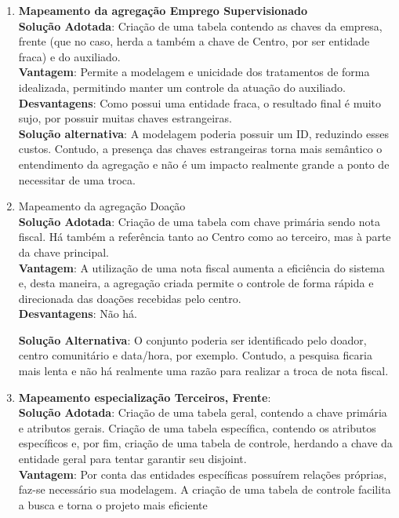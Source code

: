 \begin{enumerate}
    \item \textbf{Mapeamento da agregação Emprego Supervisionado }
    \\
    \textbf{Solução Adotada}: Criação de uma tabela contendo as chaves da empresa, frente (que no caso, herda a também a chave de Centro, por ser entidade fraca) e do auxiliado.
    \\
    \textbf{Vantagem}: Permite a modelagem e unicidade dos tratamentos de forma idealizada, permitindo manter um controle da atuação do auxiliado.
    \\ 
    \textbf{Desvantagens}: Como possui uma entidade fraca, o resultado final é muito sujo, por possuir muitas chaves estrangeiras.
    \\
    \textbf{Solução alternativa}: A modelagem poderia possuir um ID, reduzindo esses custos. Contudo, a presença das chaves estrangeiras torna mais semântico o entendimento da agregação e não é um impacto realmente grande a ponto de necessitar de uma troca.

    \item Mapeamento da agregação Doação
    \\
    \textbf{Solução Adotada}: Criação de uma tabela com chave primária sendo nota fiscal. Há também a referência tanto ao Centro como ao terceiro, mas à parte da chave principal.
    \\
    \textbf{Vantagem}: A utilização de uma nota fiscal aumenta a eficiência do sistema e, desta maneira, a agregação criada permite o controle de forma rápida e direcionada das doações recebidas pelo centro.
    \\ 
    \textbf{Desvantagens}: Não há.

    \textbf{Solução Alternativa}: O conjunto poderia ser identificado pelo doador, centro comunitário e data/hora, por exemplo. Contudo, a pesquisa ficaria mais lenta e não há realmente uma razão para realizar a troca de nota fiscal.

    \item \textbf{Mapeamento especialização Terceiros, Frente}:
    \\
    \textbf{Solução Adotada}: Criação de uma tabela geral, contendo a chave primária e atributos gerais. Criação de uma tabela específica, contendo os atributos específicos e, por fim, criação de uma tabela de controle, herdando a chave da entidade geral para tentar garantir seu disjoint.
    \\
    \textbf{Vantagem}: Por conta das entidades específicas possuírem relações próprias, faz-se necessário sua modelagem. A criação de uma tabela de controle facilita a busca e torna o projeto mais eficiente


\end{enumerate}
